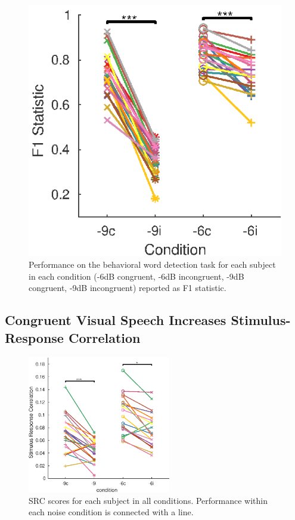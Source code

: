 \documentclass[10pt,letterpaper]{article}
\begin{document}
  \begin{figure}[h]
    \begin{center}
      \includegraphics[]{Figure2c}
    \end{center}
    \caption{Performance on the behavioral word detection
    task for each subject in each condition (-6dB congruent, 
    -6dB incongruent, -9dB congruent, -9dB incongruent) 
    reported as F1 statistic.}
    \label{behavior}
  \end{figure}

\subsection{Congruent Visual Speech Increases Stimulus-Response Correlation}

  \begin{figure}[]
    \begin{center}
      \includegraphics[width=0.8\columnwidth,height=6cm]{Figure4}
    \end{center}
    \caption{SRC scores for each subject in all conditions.
    Performance within each noise condition is connected 
    with a line.}
    \label{srcResults}
  \end{figure}
\end{document}
